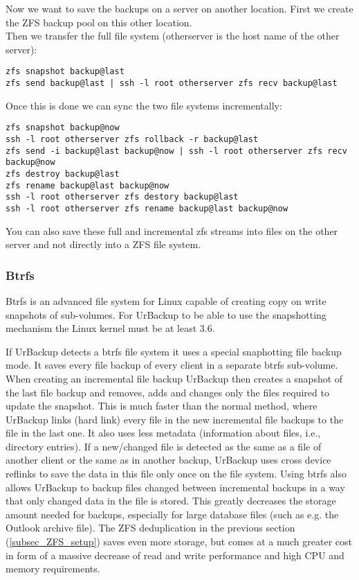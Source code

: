 \documentclass[a4paper,10pt]{article}
\begin{document}
Now we want to save the backups on a server on another location. First we create the ZFS backup pool on this other location.\\
Then we transfer the full file system (otherserver is the host name of the other server):
\begin{verbatim}
zfs snapshot backup@last
zfs send backup@last | ssh -l root otherserver zfs recv backup@last
\end{verbatim}
Once this is done we can sync the two file systems incrementally:
\begin{verbatim}
zfs snapshot backup@now
ssh -l root otherserver zfs rollback -r backup@last
zfs send -i backup@last backup@now | ssh -l root otherserver zfs recv backup@now
zfs destroy backup@last
zfs rename backup@last backup@now
ssh -l root otherserver zfs destory backup@last
ssh -l root otherserver zfs rename backup@last backup@now
\end{verbatim}
You can also save these full and incremental zfs streams into files on the other server and not directly into a ZFS file system.

\subsubsection{Btrfs}
\label{subsec_btrfs_setup}

Btrfs is an advanced file system for Linux capable of creating copy on write
snapshots of sub-volumes. For UrBackup to be
able to use the snapshotting mechanism the Linux kernel must be at least 3.6.

If UrBackup detects a btrfs file system it uses a special snaphotting file backup
mode. It saves every file backup of every client in a separate btrfs sub-volume.
When creating an incremental file backup UrBackup then creates a snapshot of the
last file backup and removes, adds and changes only the files required to update
the snapshot. This is much faster than the normal method, where UrBackup links
(hard link) every file in the new incremental file backups to the file in the
last one. It also uses less metadata (information about files, i.e., directory
entries). If a new/changed file is detected as the same as a file of another
client or the same as in another backup, UrBackup uses cross device reflinks to
save the data in this file only once on the file system. Using btrfs also allows
UrBackup to backup files changed between incremental backups in a way that only
changed data in the file is stored. This greatly decreases the storage amount
needed for backups, especially for large database files (such as e.g. the
Outlook archive file). The ZFS deduplication in the previous section
(\ref{subsec_ZFS_setup}) saves even more storage, but comes at a much greater
cost in form of a massive decrease of read and write performance and high CPU and
memory requirements.\\
\end{document}
